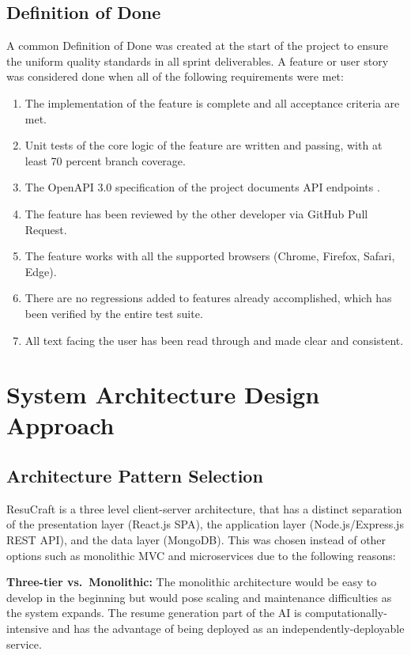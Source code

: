 \documentclass[12pt, a4paper, oneside]{report}
\begin{document}
\subsection{Definition of Done}

A common Definition of Done was created at the start of the project to ensure the uniform quality standards in all sprint deliverables\cite{pressman2014}. A feature or user story was considered done when all of the following requirements were met:

\begin{enumerate}
    \item The implementation of the feature is complete and all acceptance criteria are met.
    \item Unit tests of the core logic of the feature are written and passing, with at least 70 percent branch coverage.
    \item The OpenAPI 3.0 specification of the project documents API endpoints \cite{openapi2021}.
    \item The feature has been reviewed by the other developer via GitHub Pull Request.
    \item The feature works with all the supported browsers (Chrome, Firefox, Safari, Edge).
    \item There are no regressions added to features already accomplished, which has been verified by the entire test suite\cite{cypress2024}.
    \item All text facing the user has been read through and made clear and consistent.
\end{enumerate}

\section{System Architecture Design Approach}

\subsection{Architecture Pattern Selection}

ResuCraft is a three level client-server architecture\cite{pressman2014}, that has a distinct separation of the presentation layer (React.js SPA), the application layer (Node.js/Express.js REST API), and the data layer (MongoDB). This was chosen instead of other options such as monolithic MVC and microservices due to the following reasons:

\textbf{Three-tier vs.\ Monolithic:} The monolithic architecture would be easy to develop in the beginning but would pose scaling and maintenance difficulties as the system expands\cite{sommerville2015}. The resume generation part of the AI is computationally-intensive and has the advantage of being deployed as an independently-deployable service.
\end{document}
